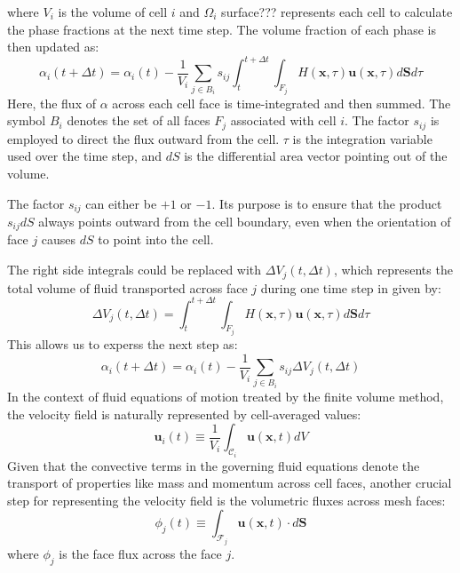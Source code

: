 where $V_i$ is the volume of cell $i$ and $\Omega_i$ surface??? represents each cell to calculate the phase fractions at the next time step. The volume fraction of each phase is then updated as: 
\begin{equation}\label{isoAd-2_}
    \alpha_{i}(t+\Delta t)=\alpha_{i}(t)-\frac{1}{V_{i}} \sum_{j \in B_{i}} s_{i j} \int_{t}^{t+\Delta t} \int_{F_{j}} H(\boldsymbol{x}, \tau) \boldsymbol{u}(\boldsymbol{x}, \tau) d \boldsymbol{S} d \tau
\end{equation}
Here, the flux of $\alpha$ across each cell face is time-integrated and then summed. The symbol $B_i$ denotes the set of all faces $F_j$ associated with cell $i$. The factor $s_{ij}$ is employed to direct the flux outward from the cell. $\tau$ is the integration variable used over the time step, and $dS$ is the differential area vector pointing out of the volume.

The factor $s_{ij}$ can either be $+1$ or $-1$. Its purpose is to ensure that the product $s_{ij}dS$ always points outward from the cell boundary, even when the orientation of face $j$ causes $dS$ to point into the cell.

The right side integrals could be replaced with $\Delta V_j(t,\Delta t)$, which represents the total volume of fluid transported across face $j$ during one time step in given by:
\begin{equation}\label{isoAd-1}
    \Delta V_{j}(t, \Delta t)=\int_{t}^{t+\Delta t} \int_{F_{j}} H(\boldsymbol{x}, \tau) \boldsymbol{u}(\boldsymbol{x}, \tau) d \boldsymbol{S} d \tau
\end{equation}
This allows us to experss the next step as: 
\begin{equation}
\alpha_{i}(t+\Delta t)=\alpha_{i}(t)-\frac{1}{V_{i}} \sum_{j \in B_{i}} s_{i j} \Delta V_{j}(t, \Delta t)
\end{equation}
In the context of fluid equations of motion treated by the finite volume method, the velocity field is naturally represented by cell-averaged values:
\begin{equation}
\mathbf{u}_{i}(t) \equiv \frac{1}{V_{i}} \int_{\mathcal{C}_{i}} \mathbf{u}(\mathbf{x}, t) d V
\end{equation}
Given that the convective terms in the governing fluid equations denote the transport of properties like mass and momentum across cell faces, another crucial step for representing the velocity field is the volumetric fluxes across mesh faces:
\begin{equation}\label{isoAd-3}
\phi_{j}(t) \equiv \int_{\mathcal{F}_{j}} \mathbf{u}(\mathbf{x}, t) \cdot d \mathbf{S}
\end{equation}
where $\phi_{j}$ is the face flux across the face $j$.
